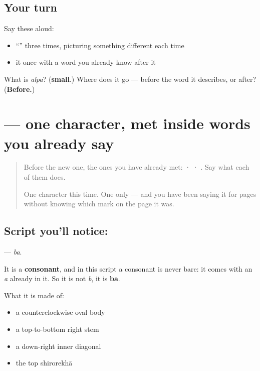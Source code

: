\subsection*{Your turn}
Say these aloud:

\begin{itemize}
\raggedright
  \item \textquotedblleft{}\textquotedblright{} three times, picturing something different each time
  \item it once with a word you already know after it
\end{itemize}

\begin{tcolorbox}[breakable,colback=teal!4,colframe=teal!35!black,title={Before you move on}]
What is \emph{alpa}? (\textbf{small}.) Where does it go — before the word it describes, or after? (\textbf{Before.})
\end{tcolorbox}
\section[\texorpdfstring{\sk{ब} (ba)}{ब (ba)}]{ — one character, met inside words you already say}

\label{lesson:SA-S216-letter-ba}



\begin{quote}
Before the new one, the ones you have already met:  ·  · . Say what each of them does.

One character this time. One only — and you have been saying it for pages without knowing which mark on the page it was.
\end{quote}

\subsection*{Script you'll notice: }
\textbf{} — \emph{ba}.

It is a \textbf{consonant}, and in this script a consonant is never bare: it comes with an \emph{a} already in it. So it is not \emph{b}, it is \textbf{ba}.

What it is made of:

\begin{itemize}
\raggedright
  \item a counterclockwise oval body
  \item a top-to-bottom right stem
  \item a down-right inner diagonal
  \item the top shirorekhā
\end{itemize}

